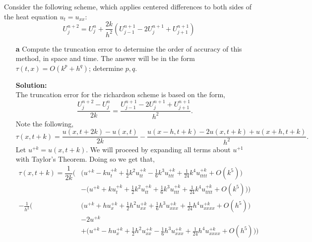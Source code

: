 \documentclass[12pt]{article}
\makeatletter
\theoremstyle{homework}
\newenvironment{exercise}[1]
{\def\@currentlabel{#1}\exercisecore}
{\endexercisecore}
\newcommand{\localhead}[1]{\par\smallskip\noindent\textbf{#1}\nobreak\\}%
\newcommand\solution{\localhead{Solution:}}
\makeatother
\begin{document}
\begin{exercise}{Problem P34}
\begin{enumerate}
    \vspace*{.15in}





  \end{enumerate}
\end{exercise}
\vspace{.15in}





\begin{exercise}{Problem P35} Consider the following scheme, which applies centered differences to both sides of the heat equation $u_t = u_{xx}$:
  \begin{equation*}
    U_j^{n+2} = U_j^n + \frac{2k}{h^2}( U_{j-1}^{n+1}-2U_j^{n+1}+ U_{j+1}^{n+1})
  \end{equation*}
  \begin{enumerate}
    \item[\textbf{a}] Compute the truncation error to determine the order of accuracy of this method, in space and time. The answer will be in the form $\tau(t, x) = O(k^p + h^q)$; determine $p, q$.
    \solution The truncation error for the richardson scheme is based on the form, 
      \begin{equation*}
        \dfrac{U_j^{n+2} -  U_j^n}{2k} =\dfrac{U_{j-1}^{n+1}-2U_j^{n+1}+ U_{j+1}^{n+1}}{h^2}.
      \end{equation*}
      Note the following, 
      \begin{equation*}
        \tau(x, t+k) =   \dfrac{u(x, t+2k) -  u(x, t)}{2k} - \dfrac{u(x - h, t + k) -2u(x, t + k)+u(x + h, t + k)}{h^2}.
      \end{equation*}
      Let $u^{+k} = u(x , t + k)$. We will proceed by expanding all terms about $u^{+1}$ with Taylor's Theorem. Doing so we get that, 
      \begin{align*}
        \tau(x, t+k) = \dfrac{1}{2k} \biggl(&\bigl(u^{+k} - ku_{t}^{+k} + \frac{1}{2}k^2u_{tt}^{+k} - \frac{1}{6}k^3u_{ttt}^{+k} + \frac{1}{24}k^4u_{tttt}^{+k} + O(k^5)\bigr)\\ 
        &- \bigl(u^{+k} + ku_{t}^{+k} + \frac{1}{2}k^2u_{tt}^{+k} + \frac{1}{6}k^3u_{ttt}^{+k} + \frac{1}{24}k^4u_{tttt}^{+k} + O(k^5)\bigr)\biggr)\\
        -\frac{1}{h^2}\biggl(&\bigl(u^{+k} + hu_{x}^{+k} + \frac{1}{2}h^2u_{xx}^{+k} + \frac{1}{6}h^3u_{xxx}^{+k} + \frac{1}{24}h^4u_{xxxx}^{+k} + O(h^5)\bigr)\\
        &-2u^{+k}\\
        &+ \bigl(u^{+k} - hu_{x}^{+k} + \frac{1}{2}h^2u_{xx}^{+k} - \frac{1}{6}h^3u_{xxx}^{+k} + \frac{1}{24}h^4u_{xxxx}^{+k} + O(h^5)\bigr)
        \biggr)
      \end{align*}


\end{enumerate}
\end{exercise}
\end{document}
